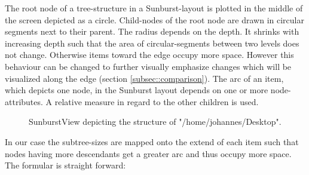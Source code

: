\begin{itemize}
The root node of a tree-structure in a Sunburst-layout is plotted in the middle of the screen depicted as a circle. Child-nodes of the root node are drawn in circular segments next to their parent. The radius depends on the depth. It shrinks with increasing depth such that the area of circular-segments between two levels does not change. Otherwise items toward the edge occupy more space. However this behaviour can be changed to further visually emphasize changes which will be visualized along the edge (section \ref{subsec::comparison}). The arc of an item, which depicts one node, in the Sunburst layout depends on one or more node-attributes. A relative measure in regard to the other children is used.

\begin{figure}[tb]
\caption{\label{fig:sunburstview} SunburstView depicting the structure of "/home/johannes/Desktop".}
\end{figure}

In our case the subtree-sizes are mapped onto the extend of each item such that nodes having more descendants get a greater arc and thus occupy more space. The formular is straight forward:


\end{itemize}
